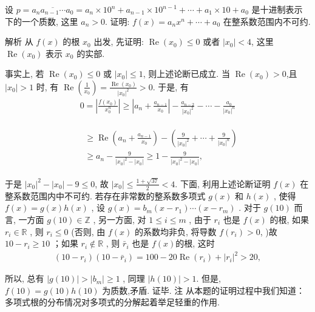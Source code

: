 \begin{example}
	设 $p=\overline{a_n a_{n-1} \cdots a_0}=a_n \times 10^n+a_{n-1} \times 10^{n-1}+\cdots+a_1 \times 10+a_0$ 是十进制表示下的一个质数, 这里 $a_n>0$. 证明: $f(x)=a_n x^n+\cdots+a_0$ 在整系数范围内不可约.
\end{example}
\begin{solution}
	解析 从 $f(x)$ 的根 $x_0$ 出发, 先证明: $\operatorname{Re}\left(x_0\right) \leqslant 0$ 或者 $\left|x_0\right|<4$, 这里 $\operatorname{Re}\left(x_0\right)$ 表示 $x_0$ 的实部.

	事实上, 若 $\operatorname{Re}\left(x_0\right) \leqslant 0$ 或 $\left|x_0\right| \leqslant 1$, 则上述论断已成立. 当 $\operatorname{Re}\left(x_0\right)>0$,且 $\left|x_0\right|>1$ 时, 有 $\operatorname{Re}\left(\frac{1}{x_0}\right)=\frac{\operatorname{Re}\left(x_0\right)}{\left|x_0\right|^2}>0$. 于是, 有
	\begin{align*}
		0=\left|\frac{f\left(x_0\right)}{x_0^n}\right| \geqslant\left|a_n+\frac{a_{n-1}}{x_0}\right|-\frac{a_{n-2}}{\left|x_0\right|^2}-\cdots-\frac{a_0}{\left|x_0\right|^n}
	\end{align*}

	\begin{align*}
		\begin{aligned}
			 & \geqslant \operatorname{Re}\left(a_n+\frac{a_{n-1}}{x_0}\right)-\left(\frac{9}{\left|x_0\right|^2}+\cdots+\frac{9}{\left|x_0\right|^n}\right) \\
			 & \geqslant a_n-\frac{9}{\left|x_0\right|^2-\left|x_0\right|} \geqslant 1-\frac{9}{\left|x_0\right|^2-\left|x_0\right|},
		\end{aligned}
	\end{align*}

	于是 $\left|x_0\right|^2-\left|x_0\right|-9 \leqslant 0$, 故 $\left|x_0\right| \leqslant \frac{1+\sqrt{37}}{2}<4$.
	下面, 利用上述论断证明 $f(x)$ 在整系数范围内中不可约.
	若存在非常数的整系数多项式 $g(x)$ 和 $h(x)$ , 使得 $f(x)=g(x) h(x)$ , 设 $g(x)=b_m\left(x-r_1\right) \cdots\left(x-r_m\right)$ . 对于 $g(10)$ 而言, 一方面 $g(10) \in \mathbb{Z}$ , 另一方面, 对 $1 \leqslant i \leqslant m$ , 由于 $r_i$ 也是 $f(x)$ 的根, 如果 $r_i \in \mathbb{R}$ , 则 $r_i \leqslant 0$ (否则, 由 $f(x)$ 的系数均非负, 将导数 $f\left(r_i\right)>0$, )故 $10-r_i \geqslant 10$ ；如果 $r_i \notin \mathbb{R}$ , 则 $\bar{r}_i$ 也是 $f(x)$的根, 这时
	\begin{align*}
		\left(10-r_i\right)\left(10-\bar{r}_i\right)=100-20 \operatorname{Re}\left(r_i\right)+\left|r_i\right|^2>20,
	\end{align*}

	所以, 总有 $|g(10)|>\left|b_m\right| \geqslant 1$ , 同理 $|h(10)|>1$.
	但是, $f(10)=g(10) h(10)$ 为质数,矛盾. 证毕.
	注 从本题的证明过程中我们知道：多项式根的分布情况对多项式的分解起着举足轻重的作用.
\end{solution}

